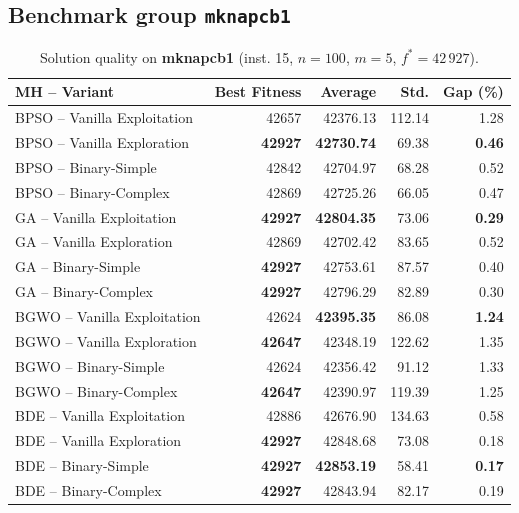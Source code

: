 \documentclass[journal,article,submit,moreauthors]{Definitions/mdpi}
\begin{document}
\subsection{Benchmark group \texttt{mknapcb1}}

\begin{table}[htbp]
  \centering
  \small
  \caption{Solution quality on \textbf{mknapcb1} (inst. 15, $n=100$, $m=5$, $f^*=42\,927$).}
  \label{tab:calidad_mknapcb1_15}
  \begin{tabular}{lrrrr}
    \toprule
    \textbf{MH -- Variant} &
    \textbf{Best Fitness} &
    \textbf{Average} &
    \textbf{Std.} &
    \textbf{Gap (\%)} \\
    \midrule
    BPSO -- Vanilla Exploitation &          42657 &         42376.13 & 112.14 &         1.28 \\
    BPSO -- Vanilla Exploration  & \textbf{42927} & \textbf{42730.74} &  69.38 & \textbf{0.46} \\
    BPSO -- Binary-Simple        &          42842 &         42704.97 &  68.28 &         0.52 \\
    BPSO -- Binary-Complex       &          42869 &         42725.26 &  66.05 &         0.47 \\
    \midrule
    GA -- Vanilla Exploitation   & \textbf{42927} & \textbf{42804.35} &  73.06 & \textbf{0.29} \\
    GA -- Vanilla Exploration    &          42869 &         42702.42 &  83.65 &         0.52 \\
    GA -- Binary-Simple          & \textbf{42927} &         42753.61 &  87.57 &         0.40 \\
    GA -- Binary-Complex         & \textbf{42927} &         42796.29 &  82.89 &         0.30 \\
    \midrule
    BGWO -- Vanilla Exploitation &          42624 & \textbf{42395.35} &  86.08 & \textbf{1.24} \\
    BGWO -- Vanilla Exploration  & \textbf{42647} &         42348.19 & 122.62 &         1.35 \\
    BGWO -- Binary-Simple        &          42624 &         42356.42 &  91.12 &         1.33 \\
    BGWO -- Binary-Complex       & \textbf{42647} &         42390.97 & 119.39 &         1.25 \\
    \midrule
    BDE -- Vanilla Exploitation  &          42886 &         42676.90 & 134.63 &         0.58 \\
    BDE -- Vanilla Exploration   & \textbf{42927} &         42848.68 &  73.08 &         0.18 \\
    BDE -- Binary-Simple         & \textbf{42927} & \textbf{42853.19} &  58.41 & \textbf{0.17} \\
    BDE -- Binary-Complex        & \textbf{42927} &         42843.94 &  82.17 &         0.19 \\
    \bottomrule
  \end{tabular}
\end{table}
\end{document}
